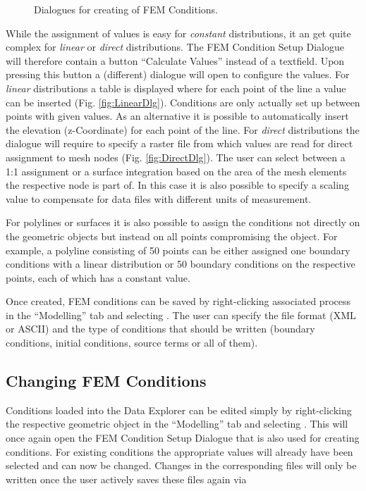 \begin{figure}[tb]
\begin{center}
\enspace
{}\enspace
{}
\end{center}
\caption{Dialogues for creating of FEM Conditions.} \label{fig:CondSetup}
\end{figure}

While the assignment of values is easy for \emph{constant} distributions, it an get quite complex for \emph{linear} or \emph{direct} distributions. The FEM Condition Setup Dialogue will therefore contain a button ``Calculate Values'' instead of a textfield. Upon pressing this button a (different) dialogue will open to configure the values. For \emph{linear} distributions a table is displayed where for each point of the line a value can be inserted (Fig. \ref{fig:LinearDlg}). Conditions are only actually set up between points with given values. As an alternative it is possible to automatically insert the elevation (z-Coordinate) for each point of the line. For \emph{direct} distributions the dialogue will require to specify a raster file from which values are read for direct assignment to mesh nodes (Fig. \ref{fig:DirectDlg}). The user can select between a 1:1 assignment or a surface integration based on the area of the mesh elements the respective node is part of. In this case it is also possible to specify a scaling value to compensate for data files with different units of measurement.

For polylines or surfaces it is also possible to assign the conditions not directly on the geometric objects but instead on all points compromising the object. For example, a polyline consisting of 50 points can be either assigned one boundary conditions with a linear distribution or 50 boundary conditions on the respective points, each of which has a constant value.

Once created, FEM conditions can be saved by right-clicking associated process in the ``Modelling'' tab and selecting . The user can specify the file format (XML or ASCII) and the type of conditions that should be written (boundary conditions, initial conditions, source terms or all of them).

\subsection{Changing FEM Conditions}

Conditions loaded into the \ogs Data Explorer can be edited simply by right-clicking the respective geometric object in the ``Modelling'' tab and selecting . This will once again open the FEM Condition Setup Dialogue that is also used for creating conditions. For existing conditions the appropriate values will already have been selected and can now be changed. Changes in the corresponding files will only be written once the user actively saves these files again via 

